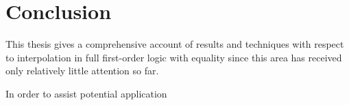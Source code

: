 \chapter{Conclusion}

This thesis gives a comprehensive account of results and techniques with respect to interpolation in full first-order logic with equality since this area has received only relatively little attention so far. 

In order to assist potential application








